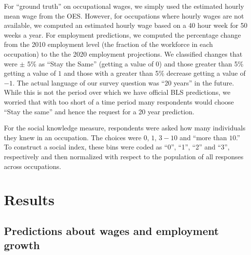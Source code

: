 \documentclass[12pt]{article}
\newcommand{\qu}[1]{``#1''}
\begin{document}
For ``ground truth'' on occupational wages, we simply used the estimated hourly mean wage from the OES.
However, for occupations where hourly wages are not available, we computed an estimated hourly wage based on a 40 hour week for 50 weeks a year.  
For employment predictions, we computed the percentage change from the 2010 employment level (the fraction of the workforce in each occupation) to the the 2020 employment projections. 
We classified changes that were $\pm$ 5\% as ``Stay the Same'' (getting a value of $0$) and those greater than 5\% getting a value of $1$ and those with a greater than 5\% decrease getting a value of $-1$.  
The actual language of our survey question was ``20 years'' in the future. 
While this is not the period over which we have official BLS predictions, we worried that with too short of a time period many respondents would choose ``Stay the same'' and hence the request for a 20 year prediction. 


For the social knowledge measure, respondents were asked how many individuals they knew in an occupation. 
The choices were $0$, $1$, $3-10$ and \qu{more than $10$.} 
To construct a social index, these bins were coded as ``0'', ``1'', ``2'' and ``3'', respectively and then normalized with respect to the population of all responses across occupations.



\section{Results}

\subsection{Predictions about wages and employment growth}
\end{document}
